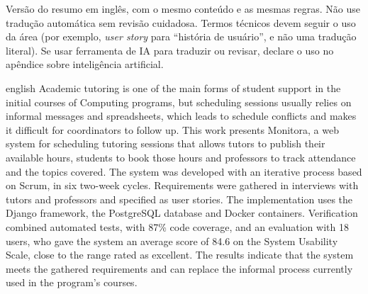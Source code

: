 \begin{resumo}[Abstract]
\begin{instrucao}
Versão do resumo em inglês, com o mesmo conteúdo e as mesmas regras. Não use
tradução automática sem revisão cuidadosa. Termos técnicos devem seguir o uso
da área (por exemplo, \emph{user story} para ``história de usuário'', e não uma
tradução literal). Se usar ferramenta de IA para traduzir ou revisar, declare
o uso no apêndice sobre inteligência artificial.
\end{instrucao}

\begin{otherlanguage*}{english}
Academic tutoring is one of the main forms of student support in the initial
courses of Computing programs, but scheduling sessions usually relies on
informal messages and spreadsheets, which leads to schedule conflicts and
makes it difficult for coordinators to follow up. This work presents Monitora,
a web system for scheduling tutoring sessions that allows tutors to publish
their available hours, students to book those hours and professors to track
attendance and the topics covered. The system was developed with an iterative
process based on Scrum, in six two-week cycles. Requirements were gathered in
interviews with tutors and professors and specified as user stories. The
implementation uses the Django framework, the PostgreSQL database and Docker
containers. Verification combined automated tests, with 87\% code coverage,
and an evaluation with 18 users, who gave the system an average score of 84.6
on the System Usability Scale, close to the range rated as excellent. The results indicate that
the system meets the gathered requirements and can replace the informal
process currently used in the program's courses.

\end{otherlanguage*}
\end{resumo}
